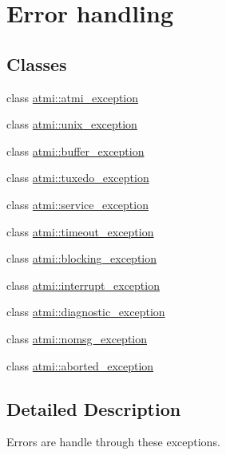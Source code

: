 \hypertarget{group__atmi-exceptions}{}\section{Error handling}
\label{group__atmi-exceptions}
\subsection*{Classes}
\begin{DoxyCompactItemize}
\item 
class \hyperlink{classatmi_1_1atmi__exception}{atmi\+::atmi\+\_\+exception}
\item 
class \hyperlink{classatmi_1_1unix__exception}{atmi\+::unix\+\_\+exception}
\item 
class \hyperlink{classatmi_1_1buffer__exception}{atmi\+::buffer\+\_\+exception}
\item 
class \hyperlink{classatmi_1_1tuxedo__exception}{atmi\+::tuxedo\+\_\+exception}
\item 
class \hyperlink{classatmi_1_1service__exception}{atmi\+::service\+\_\+exception}
\item 
class \hyperlink{classatmi_1_1timeout__exception}{atmi\+::timeout\+\_\+exception}
\item 
class \hyperlink{classatmi_1_1blocking__exception}{atmi\+::blocking\+\_\+exception}
\item 
class \hyperlink{classatmi_1_1interrupt__exception}{atmi\+::interrupt\+\_\+exception}
\item 
class \hyperlink{classatmi_1_1diagnostic__exception}{atmi\+::diagnostic\+\_\+exception}
\item 
class \hyperlink{classatmi_1_1nomsg__exception}{atmi\+::nomsg\+\_\+exception}
\item 
class \hyperlink{classatmi_1_1aborted__exception}{atmi\+::aborted\+\_\+exception}
\end{DoxyCompactItemize}


\subsection{Detailed Description}
Errors are handle through these exceptions. 